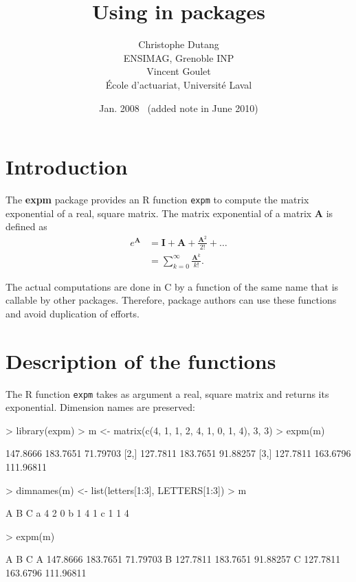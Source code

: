 \documentclass{article}
\title{Using \pkg{expm} in packages}
\author{Christophe Dutang \\ ENSIMAG, Grenoble INP \\[3ex]
    Vincent Goulet \\ École d'actuariat, Université Laval}
\date{Jan. 2008 \ {\footnotesize (added note in June 2010)}}
\newcommand{\code}[1]{\texttt{#1}}
\newcommand{\proglang}[1]{\textsf{#1}}
\newcommand{\pkg}[1]{\textbf{#1}}
\newcommand{\mat}[1]{\mathbf{#1}}
\begin{document}
\maketitle

\section{Introduction}

The \pkg{expm} package provides an \proglang{R} function \code{expm}
to compute the matrix exponential of a real, square matrix. The matrix
exponential of a matrix $\mat{A}$ is defined as
\begin{align*}
  e^{\mat{A}}
  &= \mat{I} + \mat{A} + \frac{\mat{A}^2}{2!} + \dots \\
  &= \sum_{k = 0}^\infty \frac{\mat{A}^k}{k!}.
\end{align*}

The actual computations are done in \proglang{C} by a function
of the same name that is callable by other packages. Therefore,
package authors can use these functions and avoid duplication of
efforts.

\section{Description of the functions}

The \proglang{R} function \texttt{expm} takes as argument a real,
square matrix and returns its exponential. Dimension names are
preserved:
\begin{Schunk}
\begin{Sinput}
> library(expm)
> m <- matrix(c(4, 1, 1, 2, 4, 1, 0, 1, 4), 3, 3)
> expm(m)
\end{Sinput}
\begin{Soutput}
         [,1]     [,2]      [,3]
[1,] 147.8666 183.7651  71.79703
[2,] 127.7811 183.7651  91.88257
[3,] 127.7811 163.6796 111.96811
\end{Soutput}
\begin{Sinput}
> dimnames(m) <- list(letters[1:3], LETTERS[1:3])
> m
\end{Sinput}
\begin{Soutput}
  A B C
a 4 2 0
b 1 4 1
c 1 1 4
\end{Soutput}
\begin{Sinput}
> expm(m)
\end{Sinput}
\begin{Soutput}
         A        B         C
A 147.8666 183.7651  71.79703
B 127.7811 183.7651  91.88257
C 127.7811 163.6796 111.96811
\end{Soutput}
\end{Schunk}
\end{document}
